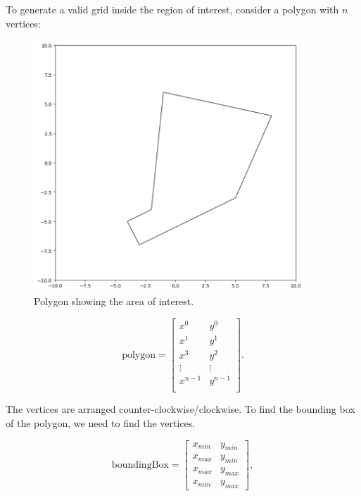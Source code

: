 To generate a valid grid inside the region of interest, consider a polygon with $n$ vertices:

\begin{figure} \label{fig:pegasus-planner-generate-grid-polygon}
  \centering
  \includegraphics[width=4in]{figures/methodology/pegasus_planner/generate_grid/polygon}
  \caption[Polygon Showing the Area of Interest]{\small Polygon showing the area of interest.}
\end{figure}

$$
\text{polygon} = \begin{bmatrix}
  x^0 & y^0 \\
  x^1 & y^1 \\
  x^3 & y^2 \\
  \vdots  & \vdots \\
  x^{n-1} & y^{n-1} \\
\end{bmatrix}. 
$$

The vertices are arranged counter-clockwise/clockwise. To find the bounding box of the polygon, we need to find the vertices.

$$
\text{boundingBox} = \begin{bmatrix}
  x_{min} & y_{min} \\
  x_{max} & y_{min} \\
  x_{max} & y_{max} \\
  x_{min} & y_{max}
\end{bmatrix},
$$

